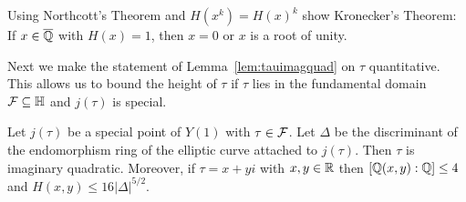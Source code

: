 \begin{exercise}
  Using Northcott's Theorem and $H(x^k)=H(x)^k$ show Kronecker's
  Theorem: If $x\in{\overline{\mathbb{Q}}}$ with $H(x)=1$, then $x=0$ or $x$ is a root
  of unity. 
\end{exercise}

Next we make the statement of Lemma~\ref{lem:tauimagquad} on $\tau$
quantitative. This allows us to bound the height of $\tau$ if $\tau$
lies in the fundamental domain ${\mathcal F}\subseteq {\mathbb{H}}$ and $j(\tau)$ is special.

\begin{lemma}
  \label{lem:heighttaubound}
  Let $j(\tau)$ be a special point of $Y(1)$ with $\tau\in{\mathcal F}$.
  Let $\Delta$ be the discriminant of
  the endomorphism ring of the elliptic curve attached to $j(\tau)$.
  Then $\tau$ is imaginary quadratic. Moreover, if $\tau =x+yi$ with
  $x,y\in{\mathbb{R}}$ then $[{\mathbb{Q}}(x,y):{\mathbb{Q}}]\le 4$ and $H(x,y)\le 16|\Delta|^{5/2}$.
\end{lemma}
